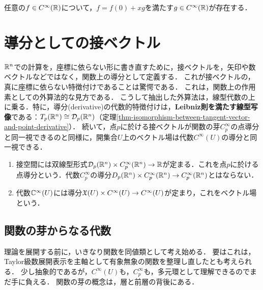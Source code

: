 \documentclass[uplatex,dvipdfmx]{jsreport}
\begin{document}
\begin{lemma}
    任意の$f\in C^\infty(\mathbb{R})$について，$f=f(0)+xg$を満たす$g\in C^\infty(\mathbb{R})$が存在する．
\end{lemma}

\section{導分としての接ベクトル}

\begin{tcolorbox}[colframe=ForestGreen, colback=ForestGreen!10!white, breakable ,colbacktitle=ForestGreen!40!white, coltitle=black,fonttitle=\bfseries\sffamily,
    title=接ベクトルとその場を，外算法の言葉で特徴付ける．]
    $\mathbb{R}^n$での計算を，座標に依らない形に書き直すために，接ベクトルを，矢印や数ベクトルなどではなく，関数上の導分として定義する．
    これが接ベクトルの，真に座標に依らない特徴付けであることは驚愕である．
    これは，関数上の作用素としての外算法的な見方である．
    こうして抽出した外算法は，線型代数の上に乗る．特に，導分(derivative)の代数的特徴付けは，\textbf{Leibniz則を満たす線型写像}である：$T_p(\mathbb{R}^n)\cong\mathcal{D}_p(\mathbb{R}^n)$（定理\ref{thm-isomorphism-between-tangent-vector-and-point-derivative}）．
    続いて，点$p$に於ける接ベクトルが関数の芽$C^\infty_p$の点導分と同一視できるのと同様に，開集合$U$上のベクトル場は代数$C^\infty(U)$の導分と同一視できる．
    \begin{enumerate}
        \item 接空間には双線型形式$\mathcal{D}_p(\mathbb{R}^n)\times C_p^\infty(\mathbb{R}^n)\to\mathbb{R}$が定まる．これを点$p$に於ける点導分という．代数$C_p^\infty$の導分$D_p(\mathbb{R}^n)\times C_p^\infty(\mathbb{R}^n)\to C_p^\infty(\mathbb{R}^n)$とはならない．
        \item 代数$\mathbb{C}^\infty(U)$には導分$\mathfrak{X}(U)\times C^\infty(U)\to C^\infty(U)$が定まり，これをベクトル場という．
    \end{enumerate}
\end{tcolorbox}

\subsection{関数の芽からなる代数}

\begin{tcolorbox}[colframe=ForestGreen, colback=ForestGreen!10!white, breakable ,colbacktitle=ForestGreen!40!white, coltitle=black,fonttitle=\bfseries\sffamily,
    title=]
    理論を展開する前に，いきなり関数を同値類として考え始める．
    要はこれは，Taylor級数展開表示を主軸として有象無象の関数を整理し直したとも考えられる．
    少し抽象的であるが，$C^\infty(U)$も，$C^\infty_p$も，多元環として理解できるのでまだ手に負える．
    関数の芽の概念は，層と前層の背後にある．
\end{tcolorbox}
\end{document}

